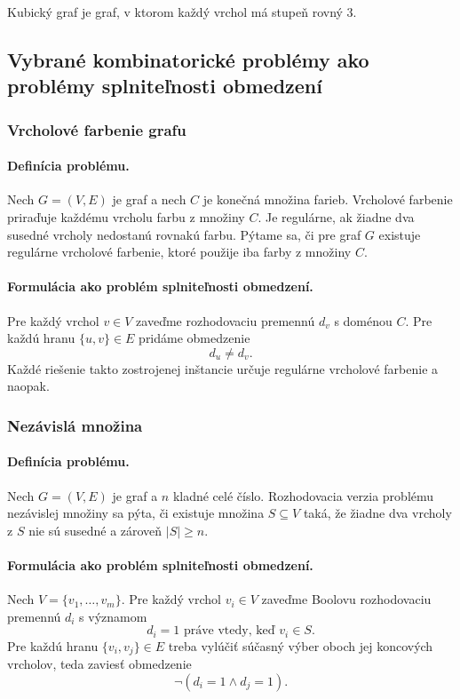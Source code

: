 \begin{definition}
    Kubický graf je graf, v ktorom každý vrchol má stupeň rovný 3.
\end{definition}

\subsection{Vybrané kombinatorické problémy ako problémy splniteľnosti obmedzení}\label{sec:combinatorics:selected-problems}

\subsubsection{Vrcholové farbenie grafu}\label{sec:combinatorics:vertex-coloring}
\paragraph{Definícia problému.}
Nech $G=(V,E)$ je graf a nech $C$ je konečná množina farieb. Vrcholové farbenie priraďuje každému vrcholu farbu z množiny $C$. Je regulárne, ak žiadne dva susedné vrcholy nedostanú rovnakú farbu. Pýtame sa, či pre graf $G$ existuje regulárne vrcholové farbenie, ktoré použije iba farby z množiny $C$.

\paragraph{Formulácia ako problém splniteľnosti obmedzení.}
Pre každý vrchol $v \in V$ zaveďme rozhodovaciu premennú $d_v$ s doménou $C$. Pre každú hranu $\{u,v\} \in E$ pridáme obmedzenie
\[
    d_u \neq d_v.
\]
Každé riešenie takto zostrojenej inštancie určuje regulárne vrcholové farbenie a naopak.

\subsubsection{Nezávislá množina}\label{sec:combinatorics:independent-set}
\paragraph{Definícia problému.}
Nech $G=(V,E)$ je graf a $n$ kladné celé číslo. Rozhodovacia verzia problému nezávislej množiny sa pýta, či existuje množina $S \subseteq V$ taká, že žiadne dva vrcholy z $S$ nie sú susedné a zároveň $|S| \geq n$.

\paragraph{Formulácia ako problém splniteľnosti obmedzení.}
Nech $V=\{v_1,\dots,v_m\}$. Pre každý vrchol $v_i \in V$ zaveďme Boolovu rozhodovaciu premennú $d_i$ s významom
\[
    d_i = 1 \text{ práve vtedy, keď } v_i \in S.
\]
Pre každú hranu $\{v_i,v_j\} \in E$ treba vylúčiť súčasný výber oboch jej koncových vrcholov, teda zaviesť obmedzenie
\[
    \lnot(d_i = 1 \land d_j = 1).
\]

